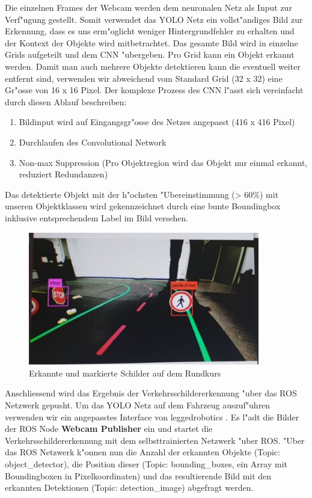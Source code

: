 Die einzelnen Frames der Webcam werden dem neuronalen Netz als Input zur Verf"ugung gestellt. Somit verwendet das YOLO Netz ein vollst"andiges Bild zur Erkennung, dass es uns erm"oglicht weniger Hintergrundfehler zu erhalten und der Kontext der Objekte wird mitbetrachtet. Das gesamte Bild wird in einzelne Grids aufgeteilt und dem CNN "ubergeben. Pro Grid kann ein Objekt erkannt werden. Damit man auch mehrere Objekte detektieren kann die eventuell weiter entfernt sind, verwenden wir abweichend vom Standard Grid (32 x 32) eine Gr"osse von 16 x 16 Pixel. Der komplexe Prozess des CNN l"asst sich vereinfacht durch diesen Ablauf beschreiben:

\begin{enumerate}
	\item Bildinput wird auf Eingangsgr"osse des Netzes angepasst (416 x 416 Pixel)
	\item Durchlaufen des Convolutional Network
	\item Non-max Suppression (Pro Objektregion wird das Objekt nur einmal erkannt, reduziert Redundanzen) 
\end{enumerate}

Das detektierte Objekt mit der h"ochsten "Ubereinstimmung (> 60\%) mit unseren Objektklassen wird gekennzeichnet durch eine bunte Boundingbox inklusive entsprechendem Label im Bild versehen.

\begin{figure}[h]
	\centering
	\includegraphics[width=0.9\textwidth,trim={0.5cm 1cm 1cm 1cm},clip]{images/boundingboxes}
	\caption{Erkannte und markierte Schilder auf dem Rundkurs}
	\label{fig:boundingboxes}
\end{figure}

Anschliessend wird das Ergebnis der Verkehrsschildererkennung "uber das ROS Netzwerk gepusht. Um das YOLO Netz auf dem Fahrzeug auszuf"uhren verwenden wir ein angepasstes Interface von leggedrobotics \cite{leggedrobotics}. Es l"adt die Bilder der ROS Node \textbf{Webcam Publisher} ein und startet die Verkehrsschildererkennung mit dem selbsttrainierten Netzwerk "uber ROS. "Uber das ROS Netzwerk k"onnen nun die Anzahl der erkannten Objekte (Topic: object\_detector), die Position dieser (Topic: bounding\_boxes, ein Array mit Boundingboxen in Pixelkoordinaten) und das resultierende Bild mit den erkannten Detektionen (Topic: detection\_image) abgefragt werden.

